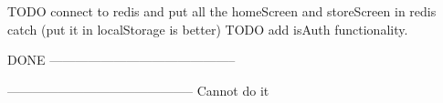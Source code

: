 TODO connect to redis and put all the homeScreen and storeScreen
        in redis catch (put it in localStorage is better)
TODO add isAuth functionality.

DONE
--------------------------------------------



--------------------------------------------
Cannot do it